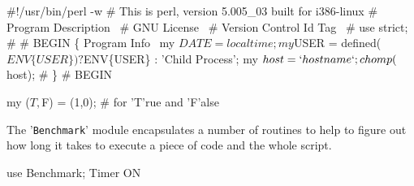 \documentclass[11pt]{article}
\def\nwendcode{\endtrivlist \endgroup} %
\let\nwdocspar=\par                    %
\begin{document}

% 
% 
% 

\newpage %
\appendix



\begin{comment}
\end{comment}

%
\newpage %



\nwenddocs{}\endmoddef
#!/usr/bin/perl -w
# This is perl, version 5.005_03 built for i386-linux
#
\LA{}Program Description~{\nwtagstyle{}}\RA{}
#
\LA{}GNU License~{\nwtagstyle{}}\RA{}
#
\LA{}Version Control Id Tag~{\nwtagstyle{}}\RA{}
#
use strict;
#
# BEGIN \{
    \LA{}Program Info~{\nwtagstyle{}}\RA{}
    my $DATE = localtime;
    my $USER = defined($ENV\{USER\}) ? $ENV\{USER\} : 'Child Process';
    my $host = `hostname`;
    chomp($host);
# \} # BEGIN
\nwendcode{}\nwdocspar

\nwenddocs{}\endmoddef
my ($T,$F) = (1,0); # for 'T'rue and 'F'alse
\nwendcode{}\nwdocspar


The '{\tt{}Benchmark}' module encapsulates a number of routines to help to figure out how long it takes to execute a piece of code and the whole script.

\nwenddocs{}\endmoddef
use Benchmark;
  \LA{}Timer ON~{\nwtagstyle{}}\RA{}
\nwendcode{}\nwdocspar
\end{document}

